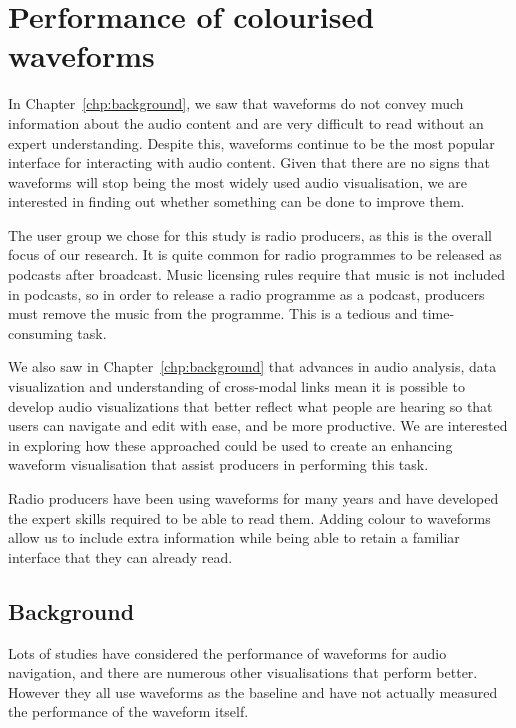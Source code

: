 \chapter{Performance of colourised waveforms}\label{chp:colourised}

In Chapter~\ref{chp:background}, we saw that waveforms do not convey much information about the audio content and are
very difficult to read without an expert understanding.
Despite this, waveforms continue to be the most popular interface for interacting with audio content.
Given that there are no signs that waveforms will stop being the most widely used audio visualisation, we are
interested in finding out whether something can be done to improve them.

The user group we chose for this study is radio producers, as this is the overall focus of our research.
It is quite common for radio programmes to be released as podcasts after broadcast.
Music licensing rules require that music is not included in podcasts, so in order to release a radio programme as a
podcast, producers must remove the music from the programme.
This is a tedious and time-consuming task.

We also saw in Chapter~\ref{chp:background} that advances in audio analysis, data visualization and understanding of
cross-modal links mean it is possible to develop audio visualizations that better reflect what people are hearing so
that users can navigate and edit with ease, and be more productive.
We are interested in exploring how these approached could be used to create an enhancing waveform visualisation that
assist producers in performing this task.

Radio producers have been using waveforms for many years and have developed the expert skills required to be able to
read them.
Adding colour to waveforms allow us to include extra information while being able to retain a familiar interface that
they can already read.

\section{Background}

Lots of studies have considered the performance of waveforms for audio navigation, and there are numerous other
visualisations that perform better.
However they all use waveforms as the baseline and have not actually measured the performance of the waveform itself.

